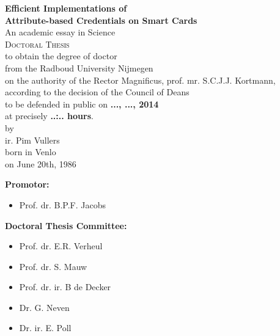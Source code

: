 \begin{center}
  \thispagestyle{empty}

  \textbf{\Large Efficient Implementations of\\ Attribute-based Credentials on Smart Cards}\\[15mm]

  An academic essay in Science \\[15mm]

  \textsc{Doctoral Thesis} \\[15mm]

  to obtain the degree of doctor \\
  from the Radboud University Nijmegen \\
  on the authority of the Rector Magnificus, prof. mr. S.C.J.J. Kortmann, \\
  according to the decision of the Council of Deans \\
  to be defended in public on \textbf{..., ..., 2014} \\
  at precisely \textbf{..:.. hours}. \\[30mm]

  by \\[30mm]

  ir. Pim Vullers \\[15mm]

  born in Venlo \\
  on June 20th, 1986
\end{center}

\clearpage

\thispagestyle{empty}

\textbf{Promotor:}
\begin{itemize}
  \item[~] Prof. dr. B.P.F. Jacobs
\end{itemize}

\textbf{Doctoral Thesis Committee:}
\begin{itemize}
  \item[~] Prof. dr. E.R. Verheul
  \item[~] Prof. dr. S. Mauw
  \item[~] Prof. dr. ir. B de Decker
  \item[~] Dr. G. Neven
  \item[~] Dr. ir. E. Poll
\end{itemize}